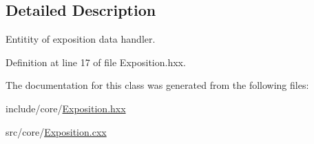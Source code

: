 \subsection{Detailed Description}
Entitity of exposition data handler. 

Definition at line 17 of file Exposition.\+hxx.



The documentation for this class was generated from the following files\+:\begin{DoxyCompactItemize}
\item 
include/core/\mbox{\hyperlink{_exposition_8hxx}{Exposition.\+hxx}}\item 
src/core/\mbox{\hyperlink{_exposition_8cxx}{Exposition.\+cxx}}\end{DoxyCompactItemize}
